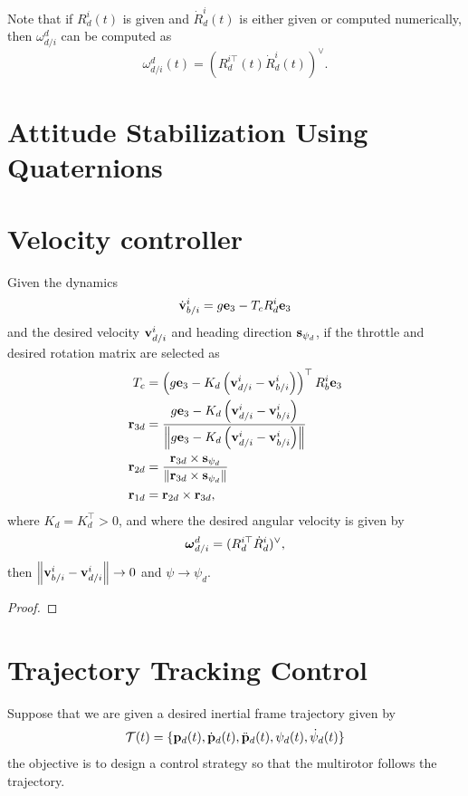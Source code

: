 Note that if $R_d^i(t)$ is given and $\dot{R}_d^i(t)$ is either given or computed numerically, then $\omega_{d/i}^d$ can be computed as
\[
\omega_{d/i}^d(t) = \left( R_d^{i\top}(t) \dot{R}_d^i(t) \right)^\vee.
\]


\section{Attitude Stabilization Using Quaternions}



\section{Velocity controller}
\label{sec:velocity_controller}

\begin{theorem}
	Given the dynamics 
	\[
	\dot{\mathbf{v}}_{b/i}^i = g\mathbf{e}_3 - T_c R_d^i\mathbf{e}_3
	\]
	and the desired velocity $\mathbf{v}_{d/i}^i$ and heading direction $\mathbf{s}_{\psi_d}$,
	if the throttle and desired rotation matrix are selected as
	\begin{align*}
		T_c &= \left(g\mathbf{e}_3 - K_d\left(\mathbf{v}_{d/i}^i-\mathbf{v}_{b/i}^i\right)\right)^\top R_b^i\mathbf{e}_3 \\
		\mathbf{r}_{3d} &= \frac{g\mathbf{e}_3 - K_d\left(\mathbf{v}_{d/i}^i-\mathbf{v}_{b/i}^i\right)}{\left\|g\mathbf{e}_3 - K_d\left(\mathbf{v}_{d/i}^i-\mathbf{v}_{b/i}^i\right)\right\|} \\
		\mathbf{r}_{2d} &= \frac{\mathbf{r}_{3d} \times \mathbf{s}_{\psi_d}}{\left\|\mathbf{r}_{3d} \times \mathbf{s}_{\psi_d}\right\|} \\
		\mathbf{r}_{1d} &= \mathbf{r}_{2d} \times \mathbf{r}_{3d},
	\end{align*}
	where $K_d=K_d^\top > 0$, and where the desired angular velocity is given by
	\[
	\boldsymbol{\omega}_{d/i}^d = (R_d^{i\top}\dot{R}_d^{i})^\vee,
	\]
	then $\left\|\mathbf{v}_{b/i}^i - \mathbf{v}_{d/i}^i\right\| \to 0$ and $\psi \to \psi_d$.
\end{theorem}

\begin{proof}
\end{proof}



\section{Trajectory Tracking Control}
Suppose that we are given a desired inertial frame trajectory given by
\[
\mathcal{T}(t) = \{ \mathbf{p}_d(t), \dot{\mathbf{p}}_d(t), \ddot{\mathbf{p}}_d(t), \psi_d(t), \dot{\psi}_d(t) \}
\]
the objective is to design a control strategy so that the multirotor follows the trajectory.


